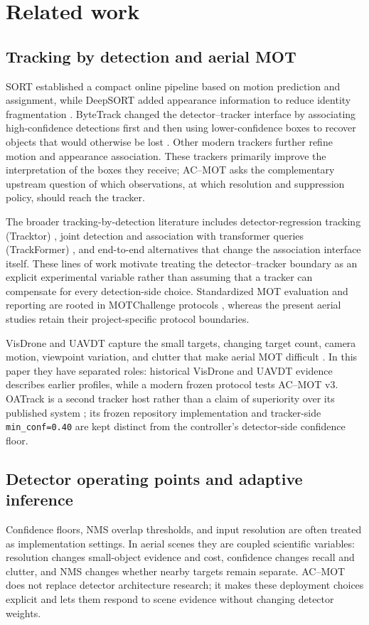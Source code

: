 \section{Related work}
\subsection{Tracking by detection and aerial MOT}
SORT established a compact online pipeline based on motion prediction and
assignment, while DeepSORT added appearance information to reduce identity
fragmentation \cite{bewley2016sort,wojke2017deepsort}. ByteTrack changed the
detector--tracker interface by associating high-confidence detections first and
then using lower-confidence boxes to recover objects that would otherwise be
lost \cite{zhang2022bytetrack}. Other modern trackers further refine motion and
appearance association. These trackers primarily improve the interpretation
of the boxes they receive; AC--MOT asks the complementary upstream question of
which observations, at which resolution and suppression policy, should reach
the tracker.

The broader tracking-by-detection literature includes detector-regression
tracking (Tracktor) \cite{bergmann2019tracktor}, joint detection and association
with transformer queries (TrackFormer) \cite{meinhardt2022trackformer}, and
end-to-end alternatives that change the association interface itself. These
lines of work motivate treating the detector--tracker boundary as an explicit
experimental variable rather than assuming that a tracker can compensate for
every detection-side choice. Standardized MOT evaluation and reporting are
rooted in MOTChallenge protocols \cite{milan2020motchallenge},
whereas the present aerial studies retain their project-specific protocol
boundaries.

VisDrone and UAVDT capture the small targets, changing target count, camera
motion, viewpoint variation, and clutter that make aerial MOT difficult
\cite{zhu2022visdrone,du2018uavdt}. In this paper they have separated roles:
historical VisDrone and UAVDT evidence describes earlier profiles, while a
modern frozen protocol tests AC--MOT v3. OATrack is a second tracker host rather
than a claim of superiority over its published system \cite{qi2026oatrack}; its
frozen repository implementation and tracker-side \texttt{min\_conf=0.40} are
kept distinct from the controller's detector-side confidence floor.

\subsection{Detector operating points and adaptive inference}
Confidence floors, NMS overlap thresholds, and input resolution are often
treated as implementation settings. In aerial scenes they are coupled
scientific variables: resolution changes small-object evidence and cost,
confidence changes recall and clutter, and NMS changes whether nearby targets
remain separate. AC--MOT does not replace detector architecture research; it
makes these deployment choices explicit and lets them respond to scene evidence
without changing detector weights.

